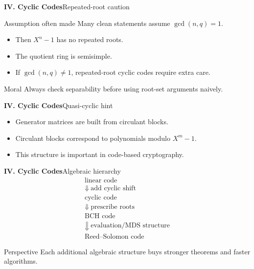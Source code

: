 \begin{frame}{\textbf{IV. Cyclic Codes}}{Repeated-root caution}
\small
\begin{block}{Assumption often made}
Many clean statements assume $\gcd(n,q)=1$.
\end{block}
\begin{itemize}
  \item Then $X^n-1$ has no repeated roots.
  \item The quotient ring is semisimple.
  \item If $\gcd(n,q)\ne1$, repeated-root cyclic codes require extra care.
\end{itemize}
\begin{block}{Moral}
Always check separability before using root-set arguments naively.
\end{block}
\end{frame}

\begin{frame}{\textbf{IV. Cyclic Codes}}{Quasi-cyclic hint}
\small
{}
\begin{itemize}
  \item Generator matrices are built from circulant blocks.
  \item Circulant blocks correspond to polynomials modulo $X^m-1$.
  \item This structure is important in code-based cryptography.
\end{itemize}
\end{frame}

\begin{frame}{\textbf{IV. Cyclic Codes}}{Algebraic hierarchy}
\small
\[
\begin{array}{c}
\text{linear code}\\
\Downarrow\ \text{add cyclic shift}\\
\text{cyclic code}\\
\Downarrow\ \text{prescribe roots}\\
\text{BCH code}\\
\Downarrow\ \text{evaluation/MDS structure}\\
\text{Reed--Solomon code}
\end{array}
\]
\begin{block}{Perspective}
Each additional algebraic structure buys stronger theorems and faster algorithms.
\end{block}
\end{frame}

